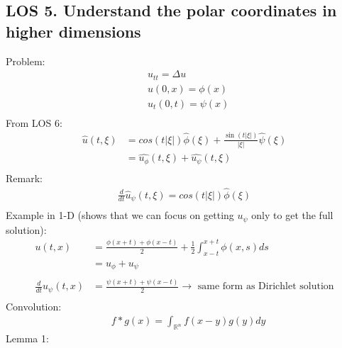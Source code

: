 \documentclass[12pt, a4paper]{article}
\begin{document}
\subsection*{LOS 5. Understand the polar coordinates in higher dimensions}
Problem:
\begin{align*}
    &u_{tt} = \Delta u\\
    &u(0, x) = \phi(x)\\
    &u_t(0, t) = \psi(x)\\
\end{align*}
From LOS 6:
\begin{align*}
    \hat{u}(t, \xi) &= cos(t|\xi|)\hat{\phi}(\xi) + \frac{\sin(t|\xi|)}{|\xi|}\hat{\psi}(\xi)\\
    &=\widehat{u_\phi}(t, \xi) + \widehat{u_\psi}(t, \xi)\\
\end{align*}
Remark:
\begin{align*}
    \frac{d}{dt}\hat{u}_\psi(t, \xi)=  cos(t|\xi|)\hat{\phi}(\xi)\\
\end{align*}
Example in 1-D (shows that we can focus on getting $u_\psi$ only to get the full solution):
\begin{align*}
    u(t, x)&=\frac{\phi(x+t)+\phi(x-t)}{2} +\frac{1}{2}\int_{x-t}^{x+t}\phi(x, s)ds\\
    &=u_\phi+u_\psi\\\\
    \frac{d}{dt}u_\psi(t, x)&= \frac{\psi(x+t)+\psi(x-t)}{2} \rightarrow \text{ same form as Dirichlet solution}\\
\end{align*}
Convolution:
\begin{align*}
    &f*g(x) = \int_{\mathbb{R}^n}f(x-y)g(y)dy
\end{align*}
Lemma 1:
\end{document}
